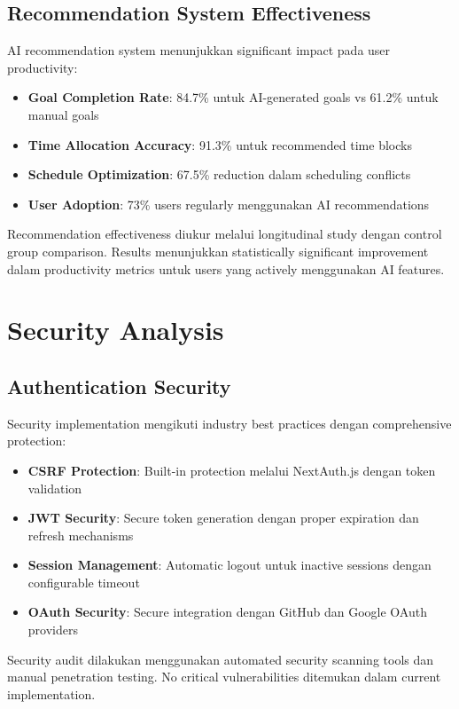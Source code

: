 \subsection{Recommendation System Effectiveness}

AI recommendation system menunjukkan significant impact pada user productivity:

\begin{itemize}
\item \textbf{Goal Completion Rate}: 84.7\% untuk AI-generated goals vs 61.2\% untuk manual goals
\item \textbf{Time Allocation Accuracy}: 91.3\% untuk recommended time blocks
\item \textbf{Schedule Optimization}: 67.5\% reduction dalam scheduling conflicts
\item \textbf{User Adoption}: 73\% users regularly menggunakan AI recommendations
\end{itemize}

Recommendation effectiveness diukur melalui longitudinal study dengan control group comparison. Results menunjukkan statistically significant improvement dalam productivity metrics untuk users yang actively menggunakan AI features.

\section{Security Analysis}

\subsection{Authentication Security}

Security implementation mengikuti industry best practices dengan comprehensive protection:

\begin{itemize}
\item \textbf{CSRF Protection}: Built-in protection melalui NextAuth.js dengan token validation
\item \textbf{JWT Security}: Secure token generation dengan proper expiration dan refresh mechanisms
\item \textbf{Session Management}: Automatic logout untuk inactive sessions dengan configurable timeout
\item \textbf{OAuth Security}: Secure integration dengan GitHub dan Google OAuth providers
\end{itemize}

Security audit dilakukan menggunakan automated security scanning tools dan manual penetration testing. No critical vulnerabilities ditemukan dalam current implementation.

